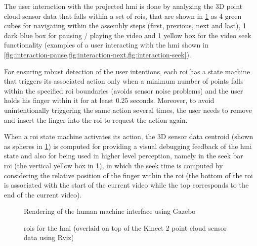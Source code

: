The user interaction with the projected \gls{hmi} is done by analyzing the 3D point cloud sensor data that falls within a set of \glspl{roi}, that are shown in \cref{fig:interaction-rois} as 4 green cubes for navigating within the assembly steps (first, previous, next and last), 1 dark blue box for pausing / playing the video and 1 yellow box for the video seek functionality (examples of a user interacting with the \gls{hmi} shown in \cref{fig:interaction-pause,fig:interaction-next,fig:interaction-seek}).

For ensuring robust detection of the user intentions, each \gls{roi} has a state machine that triggers its associated action only when a minimum number of points falls within the specified \gls{roi} boundaries (avoids sensor noise problems) and the user holds his finger within it for at least 0.25 seconds. Moreover, to avoid unintentionally triggering the same action several times, the user needs to remove and insert the finger into the \gls{roi} to request the action again.

When a \gls{roi} state machine activates its action, the 3D sensor data centroid (shown as spheres in \cref{fig:interaction-rois}) is computed for providing a visual debugging feedback of the \gls{hmi} state and also for being used in higher level perception, namely in the seek bar \gls{roi} (the vertical yellow box in \cref{fig:interaction-rois}), in which the seek time is computed by considering the relative position of the finger within the \gls{roi} (the bottom of the \gls{roi} is associated with the start of the current video while the top corresponds to the end of the current video).

\begin{figure}[H]
	\begin{floatrow}[2]
		{\caption{Rendering of the human machine interface using Gazebo}\label{fig:human-machine-interface}\vspace{-0.5em}}
		{\caption{\glspl{roi} for the \gls{hmi} (overlaid on top of the Kinect 2 point cloud sensor data using Rviz)}\label{fig:interaction-rois}\vspace{-0.5em}}
	\end{floatrow}
\end{figure}

